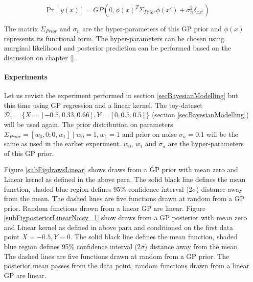 \begin{equation}\label{eqNoisyPriorDistributionOverLinearFunctions}
    \Pr[y(x)] = GP(0, \phi(x)^{T} \Sigma_{Prior} \phi(x') + \sigma_{n}^2\delta_{xx'})
\end{equation}

The matrix \(\Sigma_{Prior}\) and \(\sigma_{n}\) are the hyper-parameters of this GP prior and \(\phi(x)\) represents its functional form. The hyper-parameters can be chosen using marginal likelihood and posterior prediction can be performed based on the discussion on chapter \ref{}. 

\paragraph{Experiments}\label{paraLinearGPExperiment}
Let us revisit the experiment performed in section \ref{secBayesianModelling} but this time using GP regression and a linear kernel. The toy-dataset \(\mathcal{D}_{1} = \{X = [-0.5, 0.33, 0.66], Y = [0, 0.5, 0.5]\}\) (section \ref{secBayesianModelling}) will be used again. The prior distribution on parameters \(\Sigma_{Prior} = [w_{0}, 0; 0, w_{1}] \mid w_{0} = 1, w_{1} = 1\) and prior on noise \(\sigma_{n} = 0.1\) will be the same as used in the earlier experiment. \(w_{0}\), \(w_{1}\) and \(\sigma_{n}\) are the hyper-parameters of this GP prior. 

Figure \ref{subFigdrawsLinear} shows draws from a GP prior with mean zero and Linear kernel as defined in the above para. The solid black line defines the mean function, shaded blue region defines 95\% confidence interval (2\(\sigma\)) distance away from the mean. The dashed lines are five functions drawn at random from a GP prior. Random functions drawn from a linear GP are linear. Figure \ref{subFigposteriorLinearNoisy_1} show draws from a GP posterior with mean zero and Linear kernel  as defined in above para and conditioned on the first data point \(X = -0.5, Y = 0\). The solid black line defines the mean function, shaded blue region defines 95\% confidence interval (2\(\sigma\)) distance away from the mean. The dashed lines are five functions drawn at random from a GP prior. The posterior mean passes from the data point, random functions drawn from a linear GP are linear.


